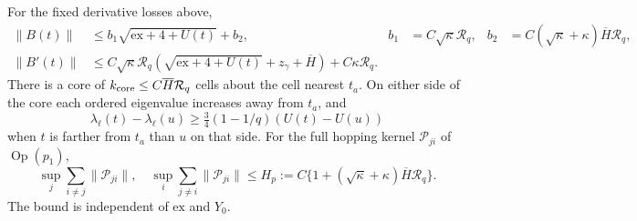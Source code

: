 \begin{lemma}\label{lem:libhopping}
For the fixed derivative losses above,
\begin{align}
 \|B(t)\|&\le b_1\sqrt{\mathrm{ex}+4+U(t)}+b_2,
 &b_1&=C\sqrt\kappa\mathcal R_q,
 &b_2&=C(\sqrt\kappa+\kappa)\overline H\mathcal R_q,
 \label{eq:libB}\\
 \|B'(t)\|&\le C\sqrt\kappa\mathcal R_q
   (\sqrt{\mathrm{ex}+4+U(t)}+z_\gamma+\overline H)
       +C\kappa\mathcal R_q.\label{eq:libBder}
\end{align}
There is a core of $k_{\rm core}\le C\overline H\mathcal R_q$ cells
about the cell nearest $t_a$. On either side of the core each ordered
eigenvalue increases away from $t_a$, and
\begin{equation}\label{eq:libmatrixmono}
 \lambda_\ell(t)-\lambda_\ell(u)
     \ge\tfrac34(1-1/q)(U(t)-U(u))
\end{equation}
when $t$ is farther from $t_a$ than $u$ on that side.
For the full hopping kernel $\mathcal P_{ji}$ of
$\operatorname{Op}(p_1)$,
\begin{equation}\label{eq:libglobalhop}
 \sup_j\sum_{i\ne j}\|\mathcal P_{ji}\|,\quad
 \sup_i\sum_{j\ne i}\|\mathcal P_{ji}\|
 \le H_p:=C\{1+(\sqrt\kappa+\kappa)\overline H\mathcal R_q\}.
\end{equation}
The bound is independent of $\mathrm{ex}$ and $Y_0$.
\end{lemma}

